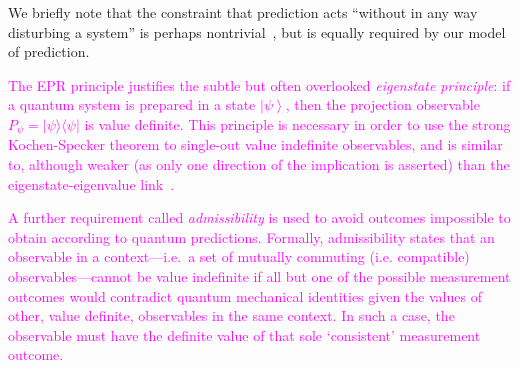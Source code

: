 \documentclass[%
 superscriptaddress,
 preprint,
 showpacs,
 showkeys,
 preprintnumbers,
  amsmath,amssymb,
  aps,
 pra,
  longbibliography,
  floatfix,
 ]{revtex4-1}
\theoremstyle{definition}
\newcommand{\ket}[1]{\left| #1 \right>}
\newcommand{\oprod}[2]{| #1 \rangle\langle #2 |}
\begin{document}
We briefly note that the constraint that prediction acts ``without in any way disturbing a system'' is perhaps nontrivial~\cite{laloe-2012}, but is equally required by our model of prediction.

\textcolor{magenta}{
The EPR principle justifies the subtle but often overlooked \emph{eigenstate principle}:
if a quantum system is prepared in a state $\ket{\psi}$, then the projection observable $P_\psi=\oprod{\psi}{\psi}$ is value definite.
This principle is necessary in order to use the strong Kochen-Specker theorem to single-out value indefinite observables, and is similar to, although weaker (as only one direction of the implication is asserted) than the eigenstate-eigenvalue link~\cite{Suarez:2004gn}.%
}

\textcolor{magenta}{
 A further requirement called \emph{admissibility} is used to
avoid outcomes  impossible to obtain according to quantum predictions.
Formally,
admissibility
states that an observable in a context---i.e.\ a set of mutually commuting (i.e. compatible) observables---cannot be value indefinite if all but one of the possible measurement outcomes would contradict quantum mechanical identities given the values of other, value definite, observables in the same context.
In such a case, the observable must have the definite value of that sole `consistent' measurement outcome.
}
\end{document}
